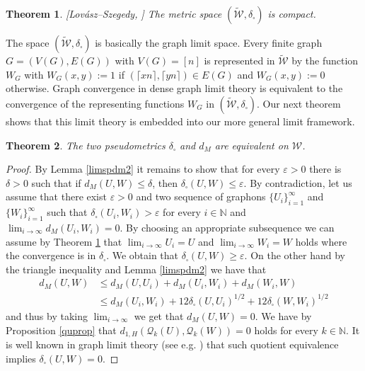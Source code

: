 \documentclass[a4wider]{amsart}
\newtheorem{theorem}{Theorem}[section]
\theoremstyle{definitionbreak}\newtheorem{D}[theorem]{Definition}
\theoremstyle{definitionbreak}\newtheorem*{D*}{Definition}
\begin{document}
\begin{theorem}\label{densecomp}[Lov\'asz--Szegedy, \cite{LSz}] The metric space $(\tilde{\mathcal{W}},\delta_\square)$ is compact.
\end{theorem}

The space $(\tilde{\mathcal{W}},\delta_\square)$ is basically the graph limit space. Every finite graph $G=(V(G),E(G))$ with $V(G)=[n]$ is represented in $\tilde{\mathcal{W}}$ by the function $W_G$ with $W_G(x,y):= 1$ if $(\lceil xn\rceil,\lceil yn\rceil)\in E(G)$ and $W_G(x,y):=0$ otherwise. Graph convergence in dense graph limit theory is equivalent to the convergence of the representing functions $W_G$ in $(\tilde{\mathcal{W}},\delta_\square)$.
Our next theorem shows that this limit theory is embedded into our more general limit framework. %

\begin{theorem}\label{dmequiv} The two pseudometrics $\delta_\square$ and $d_M$ are equivalent on $\mathcal{W}$. 
\end{theorem}

\begin{proof} By Lemma \ref{limspdm2} it remains to show that for every $\varepsilon>0$ there is $\delta>0$ such that if $d_M(U,W)\leq\delta$, then $\delta_\square(U,W)\leq\varepsilon$. By contradiction, let us assume that there exist $\varepsilon>0$ and two sequence of graphons $\{U_i\}_{i=1}^\infty$ and $\{W_i\}_{i=1}^\infty$ such that $\delta_\square(U_i,W_i)>\varepsilon$ for every $i\in\mathbb{N}$ and $\lim_{i\to\infty}d_M(U_i,W_i)=0$. By choosing an appropriate subsequence we can assume by Theorem \ref{densecomp} that $\lim_{i\to\infty} U_i=U$ and $\lim_{i\to\infty}W_i=W$ holds where the convergence is in $\delta_\square$. We obtain that $\delta_\square(U,W)\geq\varepsilon$. On the other hand by the triangle inequality and Lemma \ref{limspdm2} we have that 
\begin{align*}d_M(U,W)&\leq d_M(U,U_i)+d_M(U_i,W_i)+d_M(W_i,W)\\&\leq d_M(U_i,W_i)+12\delta_\square(U,U_i)^{1/2}+12\delta_\square(W,W_i)^{1/2}\end{align*} and thus by taking $\lim_{i\to\infty}$ we get that $d_M(U,W)=0$. We have by Proposition \ref{quprop} that $d_{1,H}(\mathcal{Q}_k(U),\mathcal{Q}_k(W))=0$ holds for every $k\in\mathbb{N}$. It is well known in graph limit theory (see e.g. \cite{BCCZ2})  that such quotient equivalence implies $\delta_\square(U,W)=0$.
\end{proof}
\end{document}

